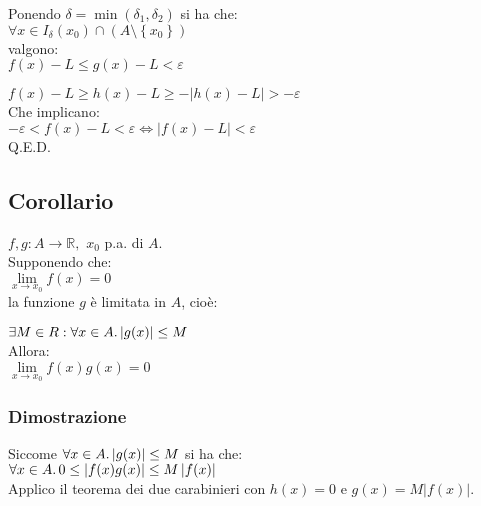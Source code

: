 \documentclass[a4paper, twoside, italian, 11pt]{book}
\newcommand{\braces}[1] {\left \{ #1 \right \}}
\newcommand{\abs}[1] {\left | #1 \right |}
\newcommand{\R}{\mathbb{R}}
\begin{document}
\noindent
Ponendo $\delta = \min(\delta_1, \delta_2)$ si ha che: \\

$\forall x \in I_{\delta}(x_0) \cap (A \setminus \braces{x_0})$ \\

\noindent
valgono: \\

$f(x) - L \leq g(x) - L < \varepsilon$

$f(x) - L \geq h(x) - L \geq -\abs{h(x) - L} > -\varepsilon$ \\

\noindent
Che implicano: \\

$-\varepsilon < f(x) - L < \varepsilon \iff \abs{f(x) - L} < \varepsilon$ \\

\noindent
Q.E.D.


\subsection{Corollario}

\noindent
$f, g : A \rightarrow \R,$ $x_0$ p.a. di $A$. \\

\noindent
Supponendo che: \\

$\lim\limits_{x \to x_0} f(x) = 0$ \\

la funzione $g$ è limitata in $A$, cioè:

$\exists M \in R : \forall x \in A \ldotp \abs{g(x)} \leq M$ \\

\noindent
Allora: \\

$\lim\limits_{x \to x_0} f(x) g(x) = 0$


\subsubsection{Dimostrazione}

\noindent
Siccome $\forall x \in A \ldotp \abs{g(x)} \leq M$ si ha che: \\

$\forall x \in A \ldotp 0 \leq \abs{f(x)g(x)} \leq M \abs{f(x)}$ \\

\noindent
Applico il teorema dei due carabinieri con $h(x) = 0$ e $g(x) = M \abs{f(x)}$. \\
\end{document}

